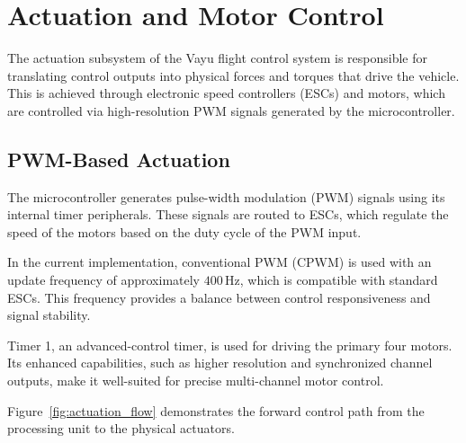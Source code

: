 \section{Actuation and Motor Control}
\label{sec:hw_actuation}

The actuation subsystem of the Vayu flight control system is responsible for translating control outputs into physical forces and torques that drive the vehicle. This is achieved through electronic speed controllers (ESCs) and motors, which are controlled via high-resolution PWM signals generated by the microcontroller.

\subsection{PWM-Based Actuation}

The microcontroller generates pulse-width modulation (PWM) signals using its internal timer peripherals. These signals are routed to ESCs, which regulate the speed of the motors based on the duty cycle of the PWM input.

In the current implementation, conventional PWM (CPWM) is used with an update frequency of approximately $400\,\text{Hz}$, which is compatible with standard ESCs. This frequency provides a balance between control responsiveness and signal stability.

Timer 1, an advanced-control timer, is used for driving the primary four motors. Its enhanced capabilities, such as higher resolution and synchronized channel outputs, make it well-suited for precise multi-channel motor control.

Figure~\ref{fig:actuation_flow} demonstrates the forward control path from the processing unit to the physical actuators.

